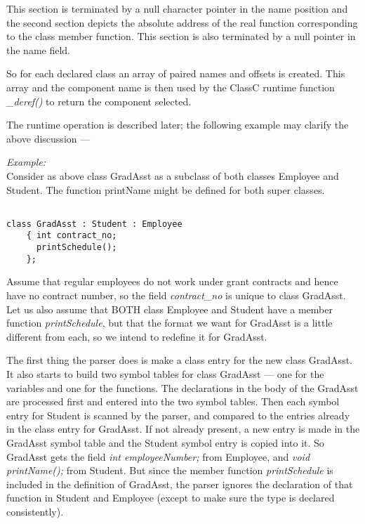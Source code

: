 This section is terminated by a null character pointer in the name position
and the second section depicts the absolute address of the real function
corresponding to the class member function.  This section is also terminated
by a null pointer in the name field.

So for each declared class an array of paired names and offsets is created.
This array and the component name is then used by the ClassC runtime
function {\em \_deref()} to return the component selected.

The runtime operation is described later; the following example may clarify
the above discussion ---

{\noindent \large \em Example:\\}
Consider as above class GradAsst as a subclass of both classes Employee
and Student.  The function printName might be defined for both super
classes.
\begin{verbatim}

class GradAsst : Student : Employee
	{ int contract_no;
	  printSchedule();
	};

\end{verbatim}
\vspace{3ex}

Assume that regular employees do not work under grant contracts
and hence have no contract number, so the field {\em contract\_no} is unique to
class GradAsst.  Let us also assume that BOTH class Employee and
Student have a member function {\em printSchedule}, but that the format we
want for GradAsst is a little different from each, so we intend to
redefine it for GradAsst.

The first thing the parser does is make a class entry for the new class
GradAsst.  It also starts to build two symbol tables for class
GradAsst --- one for the variables and one for the functions.
The declarations in the body of the GradAsst are processed first and
entered into the two symbol tables.  Then each symbol entry for Student
is scanned by the parser, and compared to the entries already in the class
entry for GradAsst.  If not already present, a new entry is made in the
GradAsst symbol table and the Student symbol entry is copied into
it.  So GradAsst gets the field {\em int employeeNumber;} from
Employee, and {\em void printName();} from Student.  But since the member
function {\em printSchedule} is included in the definition of GradAsst,
the parser ignores the declaration of that function in Student and Employee
(except to make sure the type is declared consistently).

